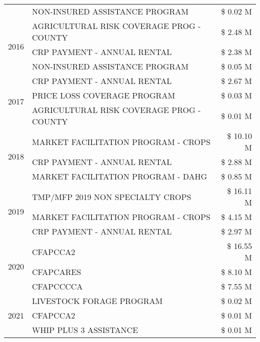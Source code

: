 \begin{tabular}{llr}
 & NON-INSURED ASSISTANCE PROGRAM & \$ 0.02 M \\
\cline{1-3}
\multirow[t]{3}{*}{2016} & AGRICULTURAL RISK COVERAGE PROG - COUNTY & \$ 2.48 M \\
 & CRP PAYMENT - ANNUAL RENTAL & \$ 2.38 M \\
 & NON-INSURED ASSISTANCE PROGRAM & \$ 0.05 M \\
\cline{1-3}
\multirow[t]{3}{*}{2017} & CRP PAYMENT - ANNUAL RENTAL & \$ 2.67 M \\
 & PRICE LOSS COVERAGE PROGRAM & \$ 0.03 M \\
 & AGRICULTURAL RISK COVERAGE PROG - COUNTY & \$ 0.01 M \\
\cline{1-3}
\multirow[t]{3}{*}{2018} & MARKET FACILITATION PROGRAM - CROPS & \$ 10.10 M \\
 & CRP PAYMENT - ANNUAL RENTAL & \$ 2.88 M \\
 & MARKET FACILITATION PROGRAM - DAHG & \$ 0.85 M \\
\cline{1-3}
\multirow[t]{3}{*}{2019} & TMP/MFP 2019 NON SPECIALTY CROPS & \$ 16.11 M \\
 & MARKET FACILITATION PROGRAM - CROPS & \$ 4.15 M \\
 & CRP PAYMENT - ANNUAL RENTAL & \$ 2.97 M \\
\cline{1-3}
\multirow[t]{3}{*}{2020} & CFAPCCA2 & \$ 16.55 M \\
 & CFAPCARES & \$ 8.10 M \\
 & CFAPCCCCA & \$ 7.55 M \\
\cline{1-3}
\multirow[t]{3}{*}{2021} & LIVESTOCK FORAGE PROGRAM & \$ 0.02 M \\
 & CFAPCCA2 & \$ 0.01 M \\
 & WHIP PLUS 3 ASSISTANCE & \$ 0.01 M \\
\cline{1-3}
\bottomrule
\end{tabular}
